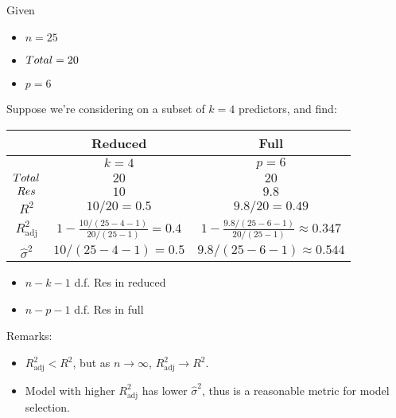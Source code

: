 \begin{Example}{}{}
    Given
    \begin{itemize}
        \item $ n=25 $
        \item $ \relax{Total}=20 $
        \item $ p=6 $
    \end{itemize}
    Suppose
    we're considering on a subset of $ k=4 $
    predictors, and find:

    \begin{center}
        \begin{NiceTabular}{|c|c|c|}
            \toprule
            & Reduced                                 & Full                                              \\
            \midrule
            & $ k=4 $                                 & $ p=6 $                                           \\
            \midrule
            $ \relax{Total} $       & $ 20 $                                  & $ 20 $                                            \\
            \midrule
            $ \relax{Res} $         & $ 10 $                                  & $ 9.8 $                                           \\
            \midrule
            $ R^2 $              & $ 10/20=0.5 $                           & $ 9.8/20=0.49 $                                   \\
            \midrule
            $ R^2_{\text{adj}} $ & $ 1-\frac{10/(25-4-1)}{20/(25-1)}=0.4 $ & $ 1-\frac{9.8/(25-6-1)}{20/(25-1)}\approx 0.347 $ \\
            \midrule
            $ \hat{\sigma}^2 $   & $ 10/(25-4-1)=0.5 $                     & $ 9.8/(25-6-1)\approx 0.544 $\\
            \bottomrule
        \end{NiceTabular}
    \end{center}
    \begin{itemize}
        \item $ n-k-1 $ d.f. Res in reduced
        \item $ n-p-1 $ d.f. Res in full
    \end{itemize}
    Remarks:
    \begin{itemize}
        \item $ R^2_{\text{adj}}<R^2 $, but as $ n\to\infty $,
              $ R^2_{\text{adj}}\to R^2 $.
        \item Model with higher $ R^2_{\text{adj}} $
              has lower $ \hat{\sigma}^2 $,
              thus is a reasonable metric for model selection.
    \end{itemize}
\end{Example}

